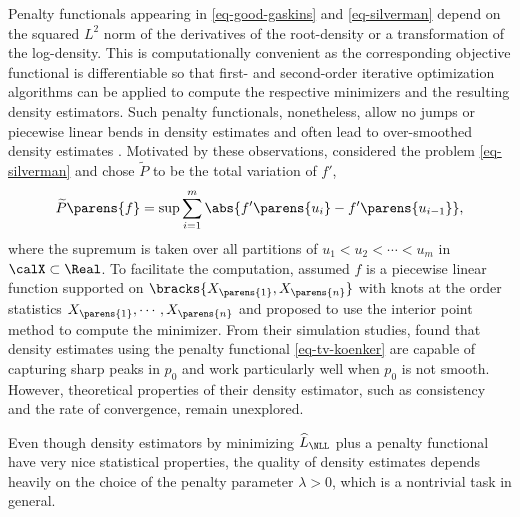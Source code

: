 \documentclass[12pt]{article}
\theoremstyle{definition}
\theoremstyle{theorem}
\theoremstyle{remark}
\begin{document}
Penalty functionals appearing in \eqref{eq-good-gaskins} and \eqref{eq-silverman} depend on the squared $L^2$ norm of the derivatives of the root-density or a transformation of the log-density. This is computationally convenient as the corresponding objective functional is differentiable so that first- and second-order iterative optimization algorithms can be applied to compute the respective minimizers and the resulting density estimators. Such penalty functionals, nonetheless, allow no jumps or piecewise linear bends in density estimates and often lead to over-smoothed density estimates \parencites{Sardy2010-hp}. Motivated by these observations, \textcites{Koenker2007-zo} considered the problem \eqref{eq-silverman} and chose $\widetilde{P}$ to be the total variation of $f'$, 
\begin{align}\label{eq-tv-koenker}
	\widetilde{P} \parens{f} = \sup \sum_{i=1}^m \abs{f' \parens{u_i} - f' \parens{u_{i-1}}}, 
\end{align}
where the supremum is taken over all partitions of $u_1 < u_2 < \cdots < u_m$ in $\calX \subset \Real$. 
To facilitate the computation, \textcite{Koenker2007-zo} assumed $f$ is a piecewise linear function supported on $\bracks{X_{\parens{1}}, X_{\parens{n}}}$ with knots at the order statistics $X_{\parens{1}}, \cdots, X_{\parens{n}}$ and proposed to use the interior point method to compute the minimizer. 
From their simulation studies, \textcite{Koenker2007-zo} found that density estimates using the penalty functional \eqref{eq-tv-koenker} are capable of capturing sharp peaks in $p_0$ and work particularly well when $p_0$ is not smooth. However, theoretical properties of their density estimator, such as consistency and the rate of convergence, remain unexplored. 


Even though density estimators by minimizing $\widehat{L}_{\NLL}$ plus a penalty functional have very nice statistical properties, the quality of density estimates depends heavily on the choice of the penalty parameter $\lambda > 0$, which is a nontrivial task in general. 
\end{document}
